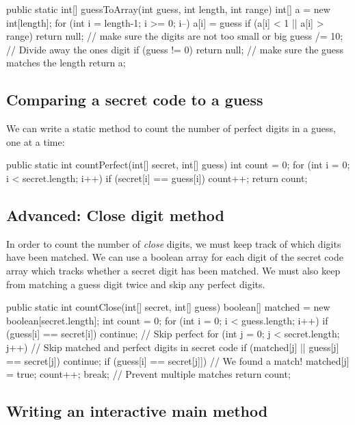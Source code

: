 \begin{code}
public static int[] guessToArray(int guess, int length, int range) {
	int[] a = new int[length];
	for (int i = length-1; i >= 0; i--) {
		a[i] = guess %
		if (a[i] < 1 || a[i] > range) {
			return null; // make sure the digits are not too small or big
		}
		guess /= 10; // Divide away the ones digit
	}
	if (guess != 0) return null; // make sure the guess matches the length
	return a;
}
\end{code}

\subsection{Comparing a secret code to a guess}

We can write a static method to count the number of perfect digits in a guess, one at a time:

\begin{code}
public static int countPerfect(int[] secret, int[] guess) {
	int count = 0;
	for (int i = 0; i < secret.length; i++) {
		if (secret[i] == guess[i]) count++;
	}
	return count;
}
\end{code}

\subsection{Advanced: Close digit method}

In order to count the number of {\em close} digits, we must keep track of which digits have been matched. We can use a boolean array for each digit of the secret code array which tracks whether a secret digit has been matched. We must also keep from matching a guess digit twice and skip any perfect digits.

\begin{code}
public static int countClose(int[] secret, int[] guess) {
	boolean[] matched = new boolean[secret.length];
	int count = 0;
	for (int i = 0; i < guess.length; i++) {
		if (guess[i] == secret[i]) continue; // Skip perfect
		for (int j = 0; j < secret.length; j++) {
			// Skip matched and perfect digits in secret code
			if (matched[j] || guess[j] == secret[j]) continue;
			if (guess[i] == secret[j]]) { // We found a match!
				matched[j] = true;
				count++;
				break; // Prevent multiple matches
			}
		}
	}
	return count;
}
\end{code}

\subsection{Writing an interactive main method}

